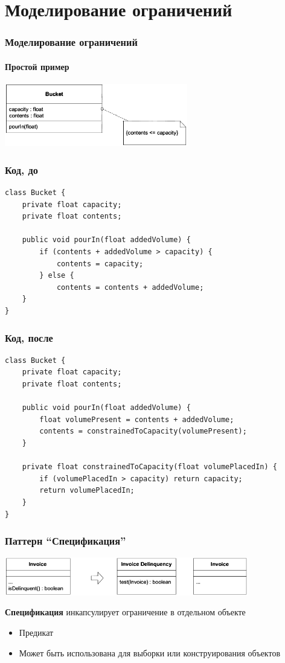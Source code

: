 \documentclass{../../slides-style}
\begin{document}
	\section{Моделирование ограничений}

	\begin{frame}
		\frametitle{Моделирование ограничений}
		\framesubtitle{Простой пример}
		\begin{center}
			\includegraphics[width=0.6\textwidth]{bucket.png}
		\end{center}
	\end{frame}

	\begin{frame}[fragile]
		\frametitle{Код, до}
		\begin{verbatim}
class Bucket {
    private float capacity;
    private float contents;

    public void pourIn(float addedVolume) {
        if (contents + addedVolume > capacity) {
            contents = capacity;
        } else {
            contents = contents + addedVolume;
    }
}
		\end{verbatim}
	\end{frame}

	\begin{frame}[fragile]
		\frametitle{Код, после}
		\begin{verbatim}
class Bucket {
    private float capacity;
    private float contents;

    public void pourIn(float addedVolume) {
        float volumePresent = contents + addedVolume;
        contents = constrainedToCapacity(volumePresent);
    }

    private float constrainedToCapacity(float volumePlacedIn) {
        if (volumePlacedIn > capacity) return capacity;
        return volumePlacedIn;
    }
} 
		\end{verbatim}
	\end{frame}

	\begin{frame}
		\frametitle{Паттерн ``Спецификация''}
		\begin{center}
			\includegraphics[width=0.8\textwidth]{specification.png}
		\end{center}
		\textbf{Спецификация} инкапсулирует ограничение в отдельном объекте
		\begin{itemize}
			\item Предикат
			\item Может быть использована для выборки или конструирования объектов
		\end{itemize}
	\end{frame}
\end{document}
